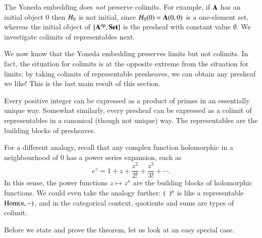 \begin{warning} 
\label{warning:yon-colims}
%
% 
The Yoneda embedding does \emph{not} preserve colimits.  For example, if
$\mathbf{A}$ has an initial object $0$ then $H_0$ is not initial, since
$H_0(0) = \mathbf{A}(0, 0)$ is a one-element set, whereas the initial object
of $[\mathbf{A}^{\mathrm{op}},\mathbf{Set}]$ is the presheaf with constant value $\emptyset$.  We
investigate colimits of representables next.
%
%
%
%
\end{warning}


%
%
%
%

We now know that the Yoneda embedding preserves limits but not colimits.
In fact, the situation for colimits is at the opposite extreme from the
situation for limits: by taking colimits of representable presheaves, we
can obtain any presheaf we like!  This is the last main result of this
section.

Every positive integer can be expressed as a product of primes%
%
%
in an essentially unique way.  Somewhat similarly, every presheaf can be
expressed as a colimit of representables in a canonical (though not unique)
way.  The representables are the building blocks of presheaves.

For a different analogy, recall that any complex function holomorphic%
%
%
in a neighbourhood of $0$ has a power%
%
%
series expansion, such as
\[
e^z 
=
1 + z + \frac{z^2}{2!} + \frac{z^3}{3!} + \cdots.
\]
In this sense, the power functions $z \mapsto z^n$ are the building blocks
of holomorphic functions.  We could even take the analogy further:
$(\hspace*{.5em})^n$ is like a representable $\operatorname{Hom}(n, -)$, and in the
categorical context, quotients and sums are types of colimit.

Before we state and prove the theorem, let us look at an easy special case.

